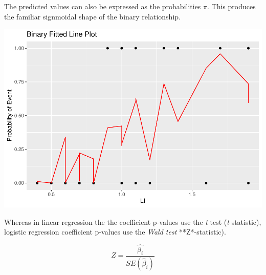 \documentclass[
]{book}
\newenvironment{Shaded}{\begin{snugshade}}{\end{snugshade}}
\newcommand{\DataTypeTok}[1]{\textcolor[rgb]{0.13,0.29,0.53}{#1}}
\newcommand{\DecValTok}[1]{\textcolor[rgb]{0.00,0.00,0.81}{#1}}
\newcommand{\KeywordTok}[1]{\textcolor[rgb]{0.13,0.29,0.53}{\textbf{#1}}}
\newcommand{\NormalTok}[1]{#1}
\newcommand{\OperatorTok}[1]{\textcolor[rgb]{0.81,0.36,0.00}{\textbf{#1}}}
\newcommand{\StringTok}[1]{\textcolor[rgb]{0.31,0.60,0.02}{#1}}
\begin{document}
The predicted values can also be expressed as the probabilities \(\pi\). This produces the familiar signmoidal shape of the binary relationship.

\begin{Shaded}
\end{Shaded}

\includegraphics{data-sci_files/figure-latex/unnamed-chunk-41-1.pdf}

Whereas in linear regression the the coefficient p-values use the \emph{t} test (\emph{t} statistic), logistic regression coefficient p-values use the \emph{Wald test} **Z*-statistic).

\[Z = \frac{\hat{\beta_i}}{SE(\hat{\beta}_i)}\]

\begin{Shaded}
\end{Shaded}
\end{document}
